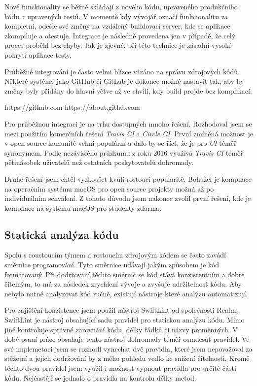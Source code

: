 Nové funckionality se běžně skládají z nového kódu, upraveného produkčního kódu a upravených testů.
V momentě kdy vývojář označí funkcionalitu za kompletní, odešle své změny na vzdálený buildovací server, kde se aplikace zkompiluje a otestuje.
Integrace je následně provedena jen v případě, že celý proces proběhl bez chyby.
Jak je zjevné, při této technice je zásadní vysoké pokrytí aplikace testy.

Průběžné integrování je často velmi blízce vázáno na správu zdrojových kódů.
Některé systémy jako GitHub či GitLab je dokonce možné nastavit tak, aby by změny byly přidány do hlavní větve až ve chvíli, kdy build projde bez komplikací. \cite{travis-ci-building-pr}

https://github.com
https://about.gitlab.com

Pro průběžnou integraci je na trhu dostupných mnoho řešení.
Rozhodoval jsem se mezi použitím komerčních řešení \textit{Travis CI} a \textit{Circle CI}.
První zmíněná možnost je v open source komunitě velmi populární a dalo by se říct, že je pro \textit{CI} téměř synonymem.
Podle nezávislého průzkumu z roku 2016 využívá \textit{Travis CI} téměř pětinásobek uživatelů než ostatních poskytovatelů dohromady. \cite{oregonstate-ci-survey}

Druhé řešení jsem chtěl vyzkoušet kvůli rostoucí popularitě. \cite{circleci-popularity}
Bohužel je kompilace na operačním systému macOS pro open source projekty možná až po individuálním schválení. \cite{circleci-pricing}
Z tohoto důvodu jsem nakonec zvolil první řešení, kde je kompilace na systému macOS pro studenty zdarma.

\subsection{Statická analýza kódu}

Spolu s roustoucím týmem a rostoucím zdrojovým kódem se často zavádí směrnice programování.
Tyto směrnice udávají jakým způsobem je kód formátovaný.
Při dodržování těchto směrnic se kód stává konzistentním a dobře čitelným, to má za následek zrychlení vývoje a zvyšuje udržitelnost kódu.
Aby nebylo nutné analyzovat kód ručně, existují nástroje které analýzu automatizují.

Pro zajištění konzistence jsem použil nástroj SwiftLint od společnosti Realm.
SwiftLint je nástroj obsahující sadu pravidel pro statickou analýzu kódu.
Mimo jiné kontroluje správné zarovnání kódu, délky řádků či názvy proměnných.
V době psaní práce obsahuje tento nástroj dohromady téměř osmdesát pravidel.
Ve své implemetaci jsem se rozhodl vynechat dvě pravidla, které jsem nepovažoval za stěžejní a jejich dodržování by z mého pohledu vedlo ke snížení čitelnosti.
Kromě těchto dvou pravidel jsem využil i možnost vypnout pravidla pro určité části kódu.
Nejčastěji se jednalo o pravidla na kontrolu délky metod.

